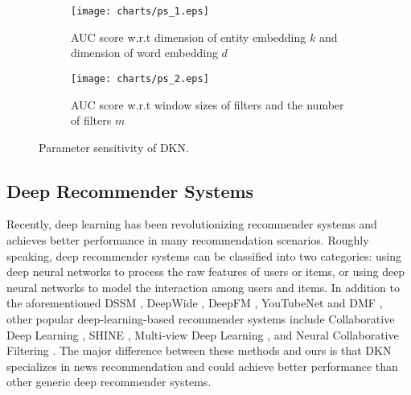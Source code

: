\documentclass[sigconf]{acmart}
\begin{document}
		\begin{figure}[t]
			\centering
            \begin{subfigure}[b]{0.232\textwidth}
                \texttt{[image: charts/ps\_1.eps]}
                \caption{AUC score w.r.t dimension of entity embedding $k$ and dimension of word embedding $d$}
                \label{fig:ps_a}
            \end{subfigure}
            \hfill
            \begin{subfigure}[b]{0.232\textwidth}
                \texttt{[image: charts/ps\_2.eps]}
                \caption{AUC score w.r.t window sizes of filters and the number of filters $m$}
                \label{fig:ps_b}
            \end{subfigure}
            \caption{Parameter sensitivity of DKN.}
            \label{fig:ps}
            \vspace{-0.05in}
        \end{figure}	
	
	\subsection{Deep Recommender Systems}
		Recently, deep learning has been revolutionizing recommender systems and achieves better performance in many recommendation scenarios.
		Roughly speaking, deep recommender systems can be classified into two categories: using deep neural networks to process the raw features of users or items, or using deep neural networks to model the interaction among users and items.
		In addition to the aforementioned DSSM \cite{huang2013learning}, DeepWide \cite{cheng2016wide}, DeepFM \cite{guo2017deepfm}, YouTubeNet \cite{covington2016deep} and DMF \cite{xue2017deep}, other popular deep-learning-based recommender systems include Collaborative Deep Learning \cite{wang2015collaborative}, SHINE \cite{wang2017shine}, Multi-view Deep Learning \cite{elkahky2015multi}, and Neural Collaborative Filtering \cite{he2017neural}.
		The major difference between these methods and ours is that DKN specializes in news recommendation and could achieve better performance than other generic deep recommender systems.
\end{document}
